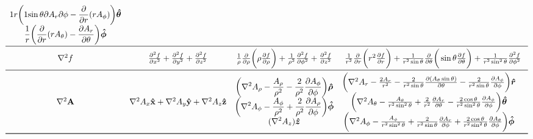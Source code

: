 \documentclass[a4paper]{scrarticle}
\begin{document}
\begin{sidewaystable}
\[\begin{array}{cccc}
\begin{matrix}
    \displaystyle{1 }{ r} \bigg ({1 }{ \sin\theta}{\partial A_r }{ \partial \phi}
    - \frac{\partial }{ \partial r} ( r A_\phi ) \bigg ) \boldsymbol{\hat \theta}\\
    \displaystyle \frac{1 }{ r}\bigg (\frac{\partial }{ \partial r} ( r A_\theta )
    - \frac{\partial A_r }{ \partial \theta} \bigg) \boldsymbol{\hat \phi}
\end{matrix}
\\
\midrule
\nabla^2 f &
    \frac{\partial^2 f }{ \partial x^2} + \frac{\partial^2 f }{ \partial y^2} + \frac{\partial^2 f }{ \partial z^2}&
    \frac{1 }{ \rho}\frac{\partial }{ \partial \rho} \bigg (\rho \frac{\partial f }{ \partial \rho} \bigg )
    + \frac{1 }{ \rho^2}\frac{\partial^2 f }{ \partial \phi^2}
    + \frac{\partial^2 f }{ \partial z^2}
    &
    \frac{1 }{ r^2}\frac{\partial }{ \partial r} \bigg (r^2 \frac{\partial f }{ \partial r} \bigg)
    + \frac{1 }{ r^2\sin\theta}\frac{\partial }{ \partial \theta} \bigg(\sin\theta \frac{\partial f }{ \partial \theta} \bigg)
    + \frac{1 }{ r^2\sin^2\theta}\frac{\partial^2 f }{ \partial \phi^2}\\
\midrule
\nabla^2 \mathbf{A} &
    \nabla^2 A_x \mathbf{\hat x} + \nabla^2 A_y \mathbf{\hat y} + \nabla^2 A_z \mathbf{\hat z} & 
\begin{matrix}
    \displaystyle \bigg (\nabla^2 A_\rho - \frac{A_\rho }{ \rho^2}
    - \frac{2 }{ \rho^2}\frac{\partial A_\phi }{ \partial \phi} \bigg) \boldsymbol{\hat\rho}\\
    \displaystyle \bigg (\nabla^2 A_\phi - \frac{A_\phi }{ \rho^2}
    + \frac{2 }{ \rho^2}\frac{\partial A_\rho }{ \partial \phi} \bigg ) \boldsymbol{\hat\phi}\\
    \displaystyle (\nabla^2 A_z ) \boldsymbol{\hat z}
\end{matrix} & 
\begin{matrix}
    \bigg (\nabla^2 A_r - \frac{2 A_r }{ r^2}
    - \frac{2 }{ r^2\sin\theta}\frac{\partial (A_\theta \sin\theta) }{ \partial\theta}
    - \frac{2 }{ r^2\sin\theta}\frac{\partial A_\phi }{ \partial \phi} \bigg ) \boldsymbol{\hat r}\\
    \bigg (\nabla^2 A_\theta - \frac{A_\theta }{ r^2\sin^2\theta}
    + \frac{2 }{ r^2}\frac{\partial A_r }{ \partial \theta}
    - \frac{2 \cos\theta }{ r^2\sin^2\theta}\frac{\partial A_\phi }{ \partial \phi} \bigg ) \boldsymbol{\hat\theta}\\
    \bigg (\nabla^2 A_\phi - \frac{A_\phi }{ r^2\sin^2\theta}
    + \frac{2 }{ r^2\sin\theta}\pdv{ A_r }{  \phi}
    + \frac{2 \cos\theta }{ r^2\sin^2\theta}\frac{\partial A_\theta }{ \partial \phi} \bigg ) \boldsymbol{\hat\phi} & 
\end{matrix}
\\ \bottomrule
\end{array}
\]
\end{sidewaystable}
\end{document}
